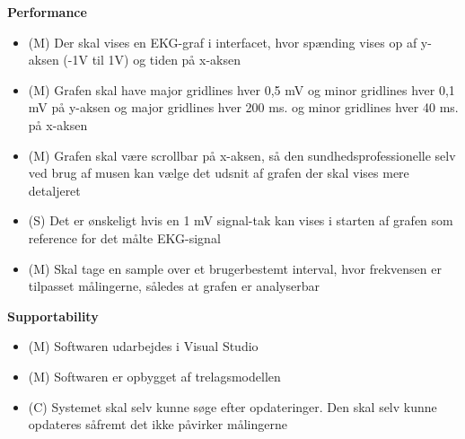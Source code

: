 \textbf{Performance}
\begin{itemize}
	\item (M) Der skal vises en EKG-graf i interfacet, hvor spænding vises op af y-aksen (-1V til 1V) og tiden på x-aksen
	\item (M) Grafen skal have major gridlines hver 0,5 mV og minor gridlines hver 0,1 mV på y-aksen og major gridlines hver 200 ms. og minor gridlines hver 40 ms. på x-aksen
	\item (M) Grafen skal være scrollbar på x-aksen, så den sundhedsprofessionelle selv ved brug af musen kan vælge det udsnit af grafen der skal vises mere detaljeret
	\item (S) Det er ønskeligt hvis en 1 mV signal-tak kan vises i starten af grafen som reference for det målte EKG-signal
	\item (M) Skal tage en sample over et brugerbestemt interval, hvor frekvensen  er tilpasset målingerne, således at grafen er analyserbar
\end{itemize}

\textbf{Supportability}
\begin{itemize}
	\item (M) Softwaren udarbejdes i Visual Studio
	\item (M) Softwaren er opbygget af trelagsmodellen
	\item (C) Systemet skal selv kunne søge efter opdateringer. Den skal selv kunne opdateres såfremt det ikke påvirker målingerne
\end{itemize}














